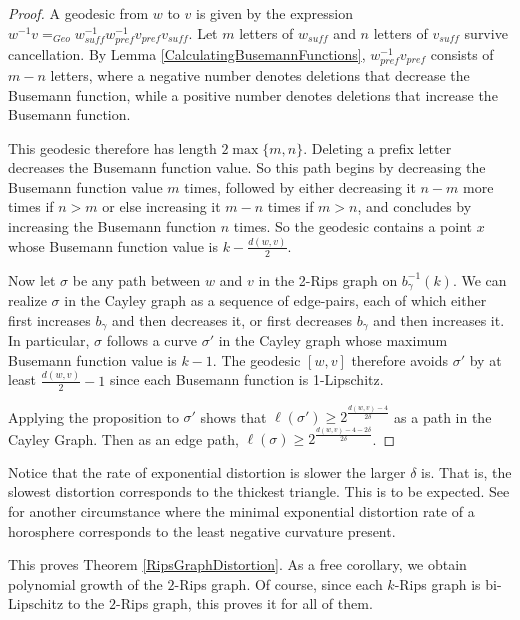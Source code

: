 \documentclass{amsart}
\theoremstyle{definition}
\theoremstyle{remark}
\begin{document}
	\begin{proof}
		
		A geodesic from $w$ to $v$ is given by the expression $w^{-1}v =_{Geo} w_{suff}^{-1}w_{pref}^{-1}v_{pref}v_{suff}$. Let $m$ letters of $w_{suff}$ and $n$ letters of $v_{suff}$ survive cancellation. By Lemma \ref{CalculatingBusemannFunctions}, $w_{pref}^{-1}v_{pref}$ consists of $m-n$ letters, where a negative number denotes deletions that decrease the Busemann function, while a positive number denotes deletions that increase the Busemann function.
		
		This geodesic therefore has length $2\max\{m, n\}$. Deleting a prefix letter decreases the Busemann function value. So this path begins by decreasing the Busemann function value $m$ times, followed by either decreasing it $n-m$ more times if $n>m$ or else increasing it $m-n$ times if $m>n$, and concludes by increasing the Busemann function $n$ times. So the geodesic contains a point $x$ whose Busemann function value is $k-\frac{d(w, v)}{2}$.
		
		Now let $\sigma$ be any path between $w$ and $v$ in the 2-Rips graph on $b_{\gamma}^{-1}(k)$. We can realize $\sigma$ in the Cayley graph as a sequence of edge-pairs, each of which either first increases $b_\gamma$ and then decreases it, or first decreases $b_\gamma$ and then increases it. In particular, $\sigma$ follows a curve $\sigma'$ in the Cayley graph whose maximum Busemann function value is $k-1$. The geodesic $[w,v]$ therefore avoids $\sigma'$ by at least $\frac{d(w, v)}{2}-1$ since each Busemann function is 1-Lipschitz.
		
		Applying the proposition to $\sigma'$ shows that $\ell(\sigma')\ge 2^{\frac{d(w, v)-4}{2\delta}}$ as a path in the Cayley Graph. Then as an edge path, $\ell(\sigma)\ge 2^{\frac{d(w, v)-4-2\delta}{2\delta}}$.
	\end{proof}
	
	Notice that the rate of exponential distortion is slower the larger $\delta$ is. That is, the slowest distortion corresponds to the thickest triangle. This is to be expected. See \cite{HeinzeImHof} for another circumstance where the minimal exponential distortion rate of a horosphere corresponds to the least negative curvature present.
	
	This proves Theorem \ref{RipsGraphDistortion}. As a free corollary, we obtain polynomial growth of the $2$-Rips graph. Of course, since each $k$-Rips graph is bi-Lipschitz to the $2$-Rips graph, this proves it for all of them.
	
\end{document}
